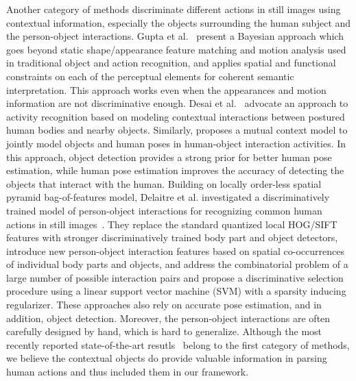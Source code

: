 \documentclass{article}
\begin{document}
Another category of methods discriminate different actions in still images using contextual information, especially the objects surrounding the human subject and the person-object interactions.  Gupta et al.~\cite{Gupta09} present a Bayesian approach which goes beyond static shape/appearance feature matching and motion analysis used in traditional object and action recognition, and applies spatial and functional constraints on each of the perceptual elements for coherent semantic interpretation.  This approach works even when the appearances and motion information are not discriminative enough.  Desai et al.~\cite{Desai10} advocate an approach to activity recognition based on modeling contextual interactions between postured human bodies and nearby objects.  Similarly, \cite{Yao12} proposes a mutual context model to jointly model objects and human poses in human-object interaction activities. In this approach, object detection provides a strong prior for better human pose estimation, while human pose estimation improves the accuracy of detecting the objects that interact with the human.  Building on locally order-less spatial pyramid bag-of-features model, Delaitre et al. investigated a discriminatively trained model of person-object interactions for recognizing common human actions in still images~\cite{Delaitre10}.  They replace the standard quantized local HOG/SIFT features with stronger discriminatively trained body part and object detectors, introduce new person-object interaction features based on spatial co-occurrences of individual body parts and objects, and address the combinatorial problem of a large number of possible interaction pairs and propose a discriminative selection procedure using a linear support vector machine (SVM) with a sparsity inducing regularizer.  These approaches also rely on accurate pose estimation, and in addition, object detection.  Moreover, the person-object interactions are often carefully designed by hand, which is hard to generalize.  Although the most recently reported state-of-the-art resutls~\cite{Sharma13,Khan13} belong to the first category of methods, we believe the contextual objects do provide valuable information in parsing human actions and thus included them in our framework.
\end{document}
